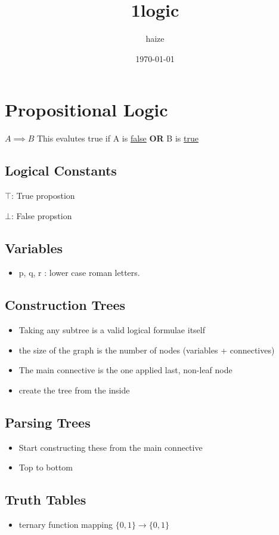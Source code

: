 \documentclass[11pt]{article}
\author{haize}
\date{\today}
\title{1logic}
\begin{document}
\maketitle
\tableofcontents

\section{Propositional Logic}
\label{sec:orgcdade8e}
\(A \implies B\)
This evalutes true if A is \uline{false} \textbf{OR} B is \uline{true}
\subsection{Logical Constants}
\label{sec:org7a05df5}
\(\top\): True propostion

\(\bot\): False propstion
\subsection{Variables}
\label{sec:orgbaa1885}
\begin{itemize}
\item p, q, r : lower case roman letters.
\end{itemize}
\subsection{Construction Trees}
\label{sec:org0028fa3}
\begin{itemize}
\item Taking any subtree is a valid logical formulae itself
\item the size of the graph is the number of nodes (variables + connectives)
\item The main connective is the one applied last, non-leaf node
\item create the tree from the inside
\end{itemize}
\subsection{Parsing Trees}
\label{sec:orgcc04d8b}
\begin{itemize}
\item Start constructing these from the main connective
\item Top to bottom
\end{itemize}
\subsection{Truth Tables}
\label{sec:orgf213b60}
\begin{itemize}
\item ternary function mapping \(\{0,1\} \rightarrow \{0,1\}\)
\end{itemize}
\end{document}

